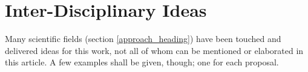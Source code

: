 %
%
%
%
%
%
%

\section{Inter-Disciplinary Ideas}
\label{inter-disciplinary_ideas_heading}

Many scientific fields (section \ref{approach_heading}) have been touched and
delivered ideas for this work, not all of whom can be mentioned or elaborated
in this article. A few examples shall be given, though; one for each proposal.





